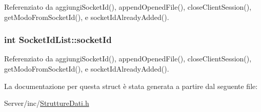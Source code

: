 Referenziato da aggiungi\+Socket\+Id(), append\+Opened\+File(), close\+Client\+Session(), get\+Modo\+From\+Socket\+Id(), e socket\+Id\+Already\+Added().

\hypertarget{structSocketIdList_ae3472c269defc3b5c5158bb23316989d}{}
\subsubsection[{socket\+Id}]{\setlength{\rightskip}{0pt plus 5cm}int Socket\+Id\+List\+::socket\+Id}\label{structSocketIdList_ae3472c269defc3b5c5158bb23316989d}


Referenziato da aggiungi\+Socket\+Id(), append\+Opened\+File(), close\+Client\+Session(), get\+Modo\+From\+Socket\+Id(), e socket\+Id\+Already\+Added().



La documentazione per questa struct è stata generata a partire dal seguente file\+:\begin{DoxyCompactItemize}
\item 
Server/inc/\hyperlink{StruttureDati_8h}{Strutture\+Dati.\+h}\end{DoxyCompactItemize}
